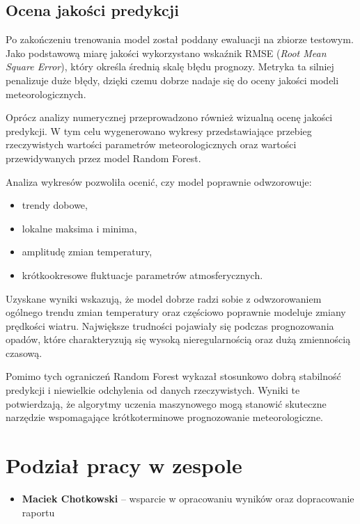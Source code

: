 \documentclass[a4paper,12pt]{article}
\begin{document}
\begin{table}[h]
\begin{table}[h]
\begin{table}[h]
\begin{table}[h]
\subsection{Ocena jakości predykcji}

Po zakończeniu trenowania model został poddany ewaluacji na zbiorze testowym. Jako podstawową miarę jakości wykorzystano wskaźnik RMSE (\textit{Root Mean Square Error}), który określa średnią skalę błędu prognozy. Metryka ta silniej penalizuje duże błędy, dzięki czemu dobrze nadaje się do oceny jakości modeli meteorologicznych.

\noindent
Oprócz analizy numerycznej przeprowadzono również wizualną ocenę jakości predykcji. W tym celu wygenerowano wykresy przedstawiające przebieg rzeczywistych wartości parametrów meteorologicznych oraz wartości przewidywanych przez model Random Forest.

\noindent
Analiza wykresów pozwoliła ocenić, czy model poprawnie odwzorowuje:

\begin{itemize}
    \item trendy dobowe,
    \item lokalne maksima i minima,
    \item amplitudę zmian temperatury,
    \item krótkookresowe fluktuacje parametrów atmosferycznych.
\end{itemize}

\noindent
Uzyskane wyniki wskazują, że model dobrze radzi sobie z odwzorowaniem ogólnego trendu zmian temperatury oraz częściowo poprawnie modeluje zmiany prędkości wiatru. Największe trudności pojawiały się podczas prognozowania opadów, które charakteryzują się wysoką nieregularnością oraz dużą zmiennością czasową.

\noindent
Pomimo tych ograniczeń Random Forest wykazał stosunkowo dobrą stabilność predykcji i niewielkie odchylenia od danych rzeczywistych. Wyniki te potwierdzają, że algorytmy uczenia maszynowego mogą stanowić skuteczne narzędzie wspomagające krótkoterminowe prognozowanie meteorologiczne.

\newpage

\section*{Podział pracy w zespole}

\begin{itemize}

    \item \textbf{Maciek Chotkowski} -- wsparcie w opracowaniu wyników oraz dopracowanie raportu


\end{itemize}
\end{table}
\end{table}
\end{table}
\end{table}
\end{document}
